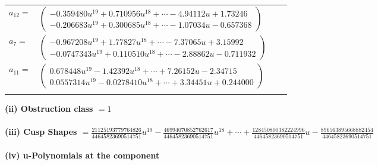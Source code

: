 \documentclass[1p]{elsarticle_modified}
\theoremstyle{definition}
\begin{document}
\begin{tabular}{m{7pt} m{180pt} m{7pt} m{180pt} }
\flushright $a_{12}=$&$\begin{pmatrix}-0.359480 u^{19}+0.710956 u^{18}+\cdots-4.94112 u+1.73246\\-0.206683 u^{19}+0.300685 u^{18}+\cdots-1.07034 u-0.657368\end{pmatrix}$ \\
\flushright $a_{7}=$&$\begin{pmatrix}-0.967208 u^{19}+1.77827 u^{18}+\cdots-7.37065 u+3.15992\\-0.0747343 u^{19}+0.110510 u^{18}+\cdots-2.88862 u-0.711932\end{pmatrix}$ \\
\flushright $a_{11}=$&$\begin{pmatrix}0.678448 u^{19}-1.42392 u^{18}+\cdots+7.26152 u-2.34715\\0.0557314 u^{19}-0.0278410 u^{18}+\cdots+3.34451 u+0.244000\end{pmatrix}$\\&\end{tabular}
\flushleft \textbf{(ii) Obstruction class $= 1$}\\~\\
\flushleft \textbf{(iii) Cusp Shapes $= \frac{21125193779764826}{44645823690514751} u^{19}-\frac{46994070852762617}{44645823690514751} u^{18}+\cdots+\frac{128450800382224996}{44645823690514751} u-\frac{896563895668882454}{44645823690514751}$}\\~\\
\newpage\renewcommand{\arraystretch}{1}
\flushleft \textbf{(iv) u-Polynomials at the component}\newline \\
\end{document}
